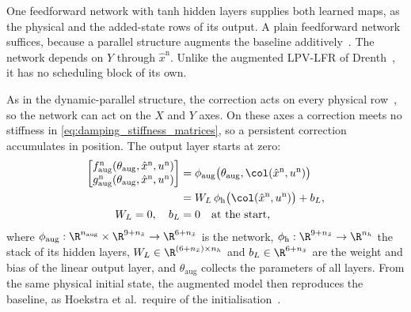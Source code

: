 One feedforward network with tanh hidden layers supplies both learned maps,
as the physical and the added-state rows of its output.
A plain feedforward network suffices, because a parallel structure augments
the baseline additively~\cite[Sec.~4.3]{hoekstra2025lfr}.
The network depends on $Y$ through $\hat x^{\mathrm n}$.
Unlike the augmented LPV-LFR of Drenth~\cite[Eq.~(5.2)]{drenth2025thesis}, it
has no scheduling block of its own.

As in the dynamic-parallel structure, the correction acts on every physical
row~\cite[Sec.~2]{hoekstra2025lfr}, so the network can act on the $X$ and $Y$
axes.
On these axes a correction meets no stiffness in
\eqref{eq:damping_stiffness_matrices}, so a persistent correction accumulates
in position.
The output layer starts at zero:
\begin{equation}
\begin{aligned}
 \begin{bmatrix}
  f^{\mathrm n}_{\mathrm{aug}}(\theta_{\mathrm{aug}},\hat x^{\mathrm n},u^{\mathrm n})\\
  g^{\mathrm n}_{\mathrm{aug}}(\theta_{\mathrm{aug}},\hat x^{\mathrm n},u^{\mathrm n})
 \end{bmatrix}
 &=\phi_{\mathrm{aug}}\bigl(\theta_{\mathrm{aug}},\col(\hat x^{\mathrm n},u^{\mathrm n})\bigr)\\
 &=W_L\,\phi_{\mathrm h}\bigl(\col(\hat x^{\mathrm n},u^{\mathrm n})\bigr)+b_L,\\
 W_L=0,\quad b_L&=0\quad\text{at the start},
\end{aligned}
\label{eq:aug_zero_init}
\end{equation}
where $\phi_{\mathrm{aug}}:\R^{n_{\mathrm{aug}}}\times\R^{9+n_{\bar x}}\to
\R^{6+n_{\bar x}}$ is the network,
$\phi_{\mathrm h}:\R^{9+n_{\bar x}}\to\R^{n_h}$ the stack of its hidden
layers, $W_L\in\R^{(6+n_{\bar x})\times n_h}$ and $b_L\in\R^{6+n_{\bar x}}$ are
the weight and bias of the linear output layer, and $\theta_{\mathrm{aug}}$
collects the parameters of all layers.
From the same physical initial state, the augmented model then reproduces the
baseline, as Hoekstra et al.\ require of the
initialisation~\cite[Eq.~(29)]{hoekstra2026lfr}.

